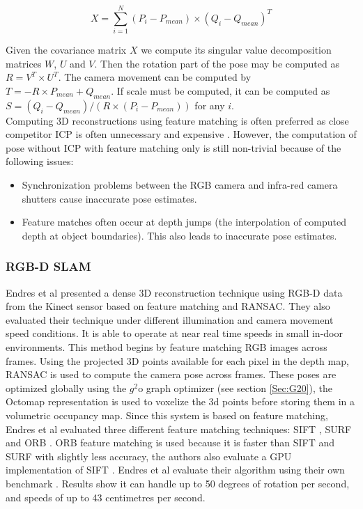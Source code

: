 \begin{equation} \label{eqn:CovarMatForFMRansac}
X = \sum_{i=1}^{N} (P_i - P_{mean}) \times (Q_i - Q_{mean})^T
\end{equation}

Given the covariance matrix $X$ we compute its singular value decomposition matrices $W$, $U$ and $V$. Then the rotation part of the pose may be computed as $R = V^T \times U^T$. The camera movement can be computed by $T = -R \times P_{mean} + Q_{mean}$. If scale must be computed, it can be computed as $S = (Q_i - Q_{mean}) / (R \times(P_i - P_{mean}))$ for any $i$. \\

Computing 3D reconstructions using feature matching is often preferred as close competitor ICP is often unnecessary and expensive \cite{Endres12Evaluation}. However, the computation of pose without ICP with feature matching only is still non-trivial because of the following issues:


\begin{itemize}
\item Synchronization problems between the RGB camera and infra-red camera shutters cause inaccurate pose estimates. 
\item Feature matches often occur at depth jumps (the interpolation of computed depth at object boundaries). This also leads to inaccurate pose estimates.
\end{itemize}


\subsubsection{RGB-D SLAM}

Endres et al \cite{Endres12Evaluation} presented a dense 3D reconstruction technique using RGB-D data from the Kinect sensor based on feature matching and RANSAC. They also evaluated their technique under different illumination and camera movement speed conditions. It is able to operate at near real time speeds in small in-door environments. This method begins by feature matching RGB images across frames. Using the projected 3D points available for each pixel in the depth map, RANSAC \cite{Fischler81Random,Huttenlocher91Fast} is used to compute the camera pose across frames. These poses are optimized globally using the $g^2$o graph optimizer (see section \ref{Sec:G20}), the Octomap representation \cite{Wurm10Octomap} is used to voxelize the 3d points before storing them in a volumetric occupancy map. Since this system is based on feature matching, Endres et al evaluated three different feature matching techniques: SIFT \cite{Lowe04Distinctive} , SURF \cite{Bay06Surf,Bay08Speeded} and ORB \cite{Rublee11Orb}. ORB feature matching is used because it is faster than SIFT and SURF with slightly less accuracy, the authors also evaluate a GPU implementation of SIFT \cite{Wu07Siftgpu}. Endres et al evaluate their algorithm using their own benchmark \cite{Sturm11Towards}. Results show it can handle up to 50 degrees of rotation per second, and speeds of up to 43 centimetres per second.  \\


